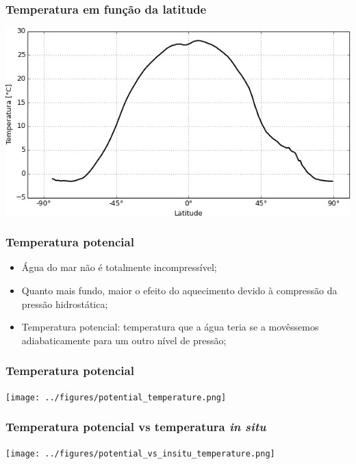 \begin{frame}
\frametitle{Temperatura em função da latitude}
    \begin{center}
        \includegraphics[scale=0.55]{./figures/latitudinal_temperature_woa09.png}
    \end{center}
\end{frame}

\begin{frame}
\frametitle{Temperatura potencial}
    \small{
    \begin{itemize}[<+-| alert@+>]
    \item Água do mar não é totalmente incompressível;
    \item Quanto mais fundo, maior o efeito do aquecimento devido à compressão
          da pressão hidrostática;
    \item Temperatura potencial: temperatura que a água teria se a movêssemos
          adiabaticamente para um outro nível de pressão;
    \end{itemize}
    }
\end{frame}

\begin{frame}
\frametitle{Temperatura potencial}
    \begin{center}
        \texttt{[image: ../figures/potential\_temperature.png]}
    \end{center}
\end{frame}

\begin{frame}
\frametitle{Temperatura potencial vs temperatura {\it in situ}}
    \begin{center}
        \texttt{[image: ../figures/potential\_vs\_insitu\_temperature.png]}
    \end{center}
\end{frame}

